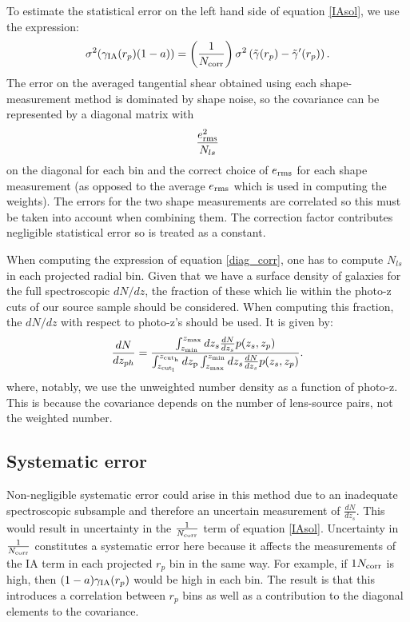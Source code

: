 \documentclass[onecolumn,amsmath,aps,fleqn, superscriptaddress]{revtex4}
\begin{document}
To estimate the statistical error on the left hand side of equation \ref{IAsol}, we use the expression:
\begin{equation}
\sigma^2(\gamma_{\rm IA}(r_p)(1-a)) = \left(\frac{1}{N_{\rm corr}}\right) \sigma^2\left(\tilde{\gamma}(r_p) - \tilde{\gamma}^\prime(r_p)\right).
\label{error}
\end{equation}
The error on the averaged tangential shear obtained using each shape-measurement method is dominated by shape noise, so the covariance can be represented by a diagonal matrix with 
\begin{equation}
\frac{e_{\rm rms}^2}{N_{ls}}
\label{diag_corr}
\end{equation} 
on the diagonal for each bin and the correct choice of $e_{\rm rms}$ for each shape measurement (as opposed to the average $e_{\rm rms}$ which is used in computing the weights). The errors for the two shape measurements are correlated so this must be taken into account when combining them. The correction factor contributes negligible statistical error so is treated as a constant.

When computing the expression of equation \ref{diag_corr}, one has to compute $N_{ls}$ in each projected radial bin. Given that we have a surface density of galaxies for the full spectroscopic $dN/dz$, the fraction of these which lie within the photo-z cuts of our source sample should be considered. When computing this fraction, the $dN / dz$ with respect to photo-z's should be used. It is given by:
\begin{equation}
\frac{dN}{dz_{ph}}= \frac{\int_{z_{\rm min}}^{z_{\rm max}} dz_s\frac{dN}{dz_s} p(z_s, z_p)}{\int_{z_{\rm cut_l}}^{z_{\rm cut_h}} d z_{\rm p} \int_{z_{\rm max}}^{z_{\rm min}} dz_s\frac{dN}{dz_s} p(z_s, z_p)}.
\label{dndzph}
\end{equation}
where, notably, we use the unweighted number density as a function of photo-z. This is because the covariance depends on the number of lens-source pairs, not the weighted number.

\subsection*{Systematic error}

Non-negligible systematic error could arise in this method due to an inadequate spectroscopic subsample and therefore an uncertain measurement of $\frac{dN}{dz_s}$. This would result in uncertainty in the $\frac{1}{N_{\rm corr}}$ term of equation \ref{IAsol}. Uncertainty in $\frac{1}{N_{\rm corr}}$ constitutes a systematic error here because it affects the measurements of the IA term in each projected $r_p$ bin in the same way. For example, if ${1}{N_{\rm corr}}$ is high, then $(1-a)\gamma_{\rm IA}(r_p)$ would be high in each bin. The result is that this introduces a correlation between $r_p$ bins as well as a contribution to the diagonal elements to the covariance. 
\end{document}
